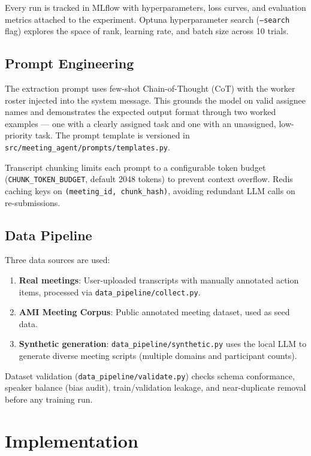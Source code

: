\documentclass[12pt,a4paper]{article}
\begin{document}
Every run is tracked in MLflow with hyperparameters, loss curves, and evaluation metrics attached to the experiment. Optuna hyperparameter search (\texttt{--search} flag) explores the space of rank, learning rate, and batch size across 10 trials.

\subsection{Prompt Engineering}

The extraction prompt uses few-shot Chain-of-Thought (CoT) with the worker roster injected into the system message. This grounds the model on valid assignee names and demonstrates the expected output format through two worked examples — one with a clearly assigned task and one with an unassigned, low-priority task. The prompt template is versioned in \texttt{src/meeting\_agent/prompts/templates.py}.

Transcript chunking limits each prompt to a configurable token budget (\texttt{CHUNK\_TOKEN\_BUDGET}, default 2048 tokens) to prevent context overflow. Redis caching keys on \texttt{(meeting\_id, chunk\_hash)}, avoiding redundant LLM calls on re-submissions.

\subsection{Data Pipeline}

Three data sources are used:
\begin{enumerate}
    \item \textbf{Real meetings}: User-uploaded transcripts with manually annotated action items, processed via \texttt{data\_pipeline/collect.py}.
    \item \textbf{AMI Meeting Corpus}: Public annotated meeting dataset, used as seed data.
    \item \textbf{Synthetic generation}: \texttt{data\_pipeline/synthetic.py} uses the local LLM to generate diverse meeting scripts (multiple domains and participant counts).
\end{enumerate}

Dataset validation (\texttt{data\_pipeline/validate.py}) checks schema conformance, speaker balance (bias audit), train/validation leakage, and near-duplicate removal before any training run.

\section{Implementation}
\end{document}
